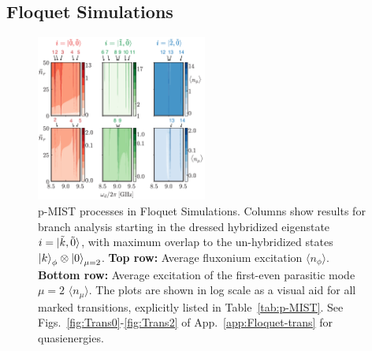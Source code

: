 \documentclass[%
reprint,
superscriptaddress,
 amsmath,amssymb,
 aps,
 prx,
longbibliography,
floatfix,
]{revtex4-2}
\begin{document}
\subsection{Floquet Simulations} 
\begin{figure}[!htb]
    \centering
    \includegraphics[width=0.5\textwidth]{Figures/Floquet_min.pdf}
    \caption{p-MIST processes in Floquet Simulations. Columns show results for branch analysis starting in the dressed hybridized eigenstate $i=\ket{\tilde{k},\tilde{0}}$, with maximum overlap to the un-hybridized states $\ket{k}_\phi\otimes\ket{0}_{\mu=2}$. \textbf{Top row:} Average fluxonium excitation $\langle n_\phi\rangle $. \textbf{Bottom row:} Average excitation of the first-even parasitic mode $\mu=2$ $\langle n_\mu\rangle$. The plots are shown in log scale as a visual aid for all marked transitions, explicitly listed in Table~\ref{tab:p-MIST}. See Figs.~\ref{fig:Trans0}-\ref{fig:Trans2} of App.~\ref{app:Floquet-trans} for quasienergies.}
    \label{fig:Floquet}
\end{figure}
\end{document}

